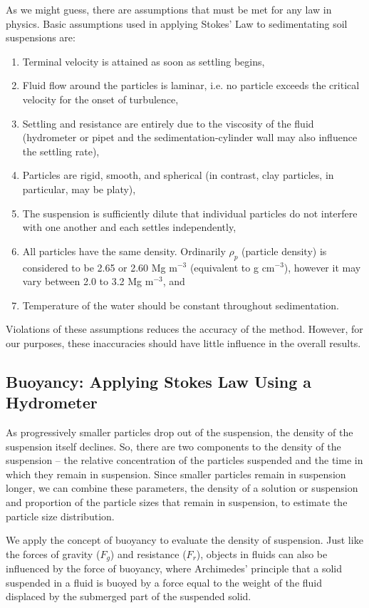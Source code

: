 \documentclass{tufte-handout}
\begin{document}
As we might guess, there are assumptions that must be met for any law in physics. 
Basic assumptions used in applying Stokes' Law to sedimentating soil suspensions are:
 
\begin{enumerate}
	\item Terminal velocity is attained as soon as settling begins,
	\item Fluid flow around the particles is laminar, i.e. no particle exceeds the critical velocity for the onset of turbulence, 
	\item Settling and resistance are entirely due to the viscosity of the fluid (hydrometer or pipet and the sedimentation-cylinder wall may also influence the settling rate),
	\item Particles are rigid, smooth, and spherical (in contrast, clay particles, in particular, may be platy),
	\item The suspension is sufficiently dilute that individual particles do not interfere with one another and each settles independently,  
	\item All particles have the same density. Ordinarily $\rho_p$ (particle density) is considered to be 2.65 or 2.60 Mg m$^{-3}$ (equivalent to g cm$^{-3}$), however it may vary between 2.0 to 3.2 Mg m$^{-3}$, and
	\item Temperature of the water should be constant throughout sedimentation.
\end{enumerate}

Violations of these assumptions reduces the accuracy of the method. However, for our purposes, these inaccuracies should have little influence in the overall results.  

\subsection{Buoyancy: Applying Stokes Law Using a Hydrometer}

As progressively smaller particles drop out of the suspension, the density of the suspension itself declines. So, there are two components to the density of the suspension -- the relative concentration of the particles suspended and the time in which they remain in suspension. Since smaller particles remain in suspension longer, we can combine these parameters, the density of a solution or suspension and proportion of the particle sizes that remain in suspension, to estimate the particle size distribution. 

We apply the concept of buoyancy to evaluate the density of suspension. Just like the forces of gravity ($F_g$) and resistance ($F_r$), objects in fluids can also be influenced by the force of buoyancy, where Archimedes' principle that a solid suspended in a fluid is buoyed by a force equal to the weight of the fluid displaced by the submerged part of the suspended solid. 
\end{document}
